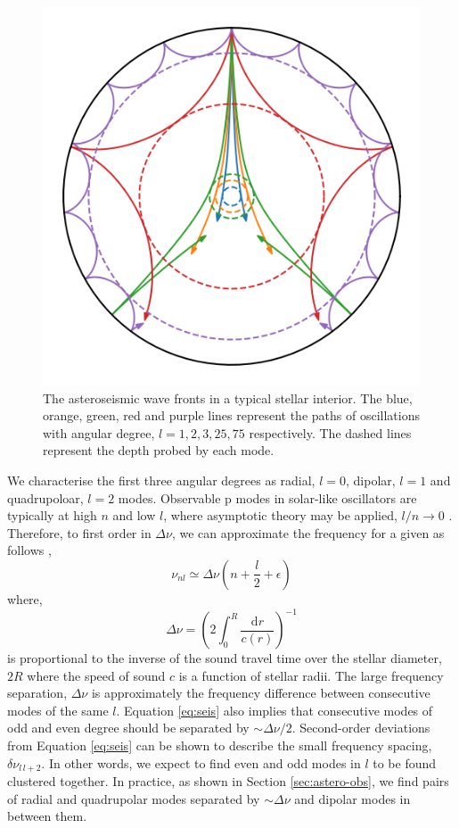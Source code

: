 \begin{figure}[ht]
    \centering
    \includegraphics[width=.5\linewidth]{introduction/images/seismo_wavefronts.png}
    \caption{The asteroseismic wave fronts in a typical stellar interior. The blue, orange, green, red and purple lines represent the paths of oscillations with angular degree, $l=1,2,3,25,75$ respectively. The dashed lines represent the depth probed by each mode.}
    \label{fig:waves}
\end{figure}

We characterise the first three angular degrees as radial, $l=0$, dipolar, $l=1$ and quadrupoloar, $l=2$ modes. Observable p modes in solar-like oscillators are typically at high $n$ and low $l$, where asymptotic theory may be applied, $l/n \rightarrow 0$ \citep{Tassoul1980}. Therefore, to first order in $\Delta\nu$, we can approximate the frequency for a given as follows \citep{Christensen-Dalsgaard1984},
%
\begin{equation}
    \nu_{nl} \simeq \Delta \nu\left(n+ \frac{l}{2} + \epsilon\right)\label{eq:seis}
\end{equation}
%
where,
%
\begin{equation}
    \Delta \nu = \left(2 \int_{0}^{R} \frac{\mathrm{d} r}{c(r)}\right)^{-1}
    \label{eq:dnu}
\end{equation}
%
is proportional to the inverse of the sound travel time over the stellar diameter, $2R$ where the speed of sound $c$ is a function of stellar radii. The large frequency separation, $\Delta\nu$ is approximately the frequency difference between consecutive modes of the same $l$. Equation \ref{eq:seis} also implies that consecutive modes of odd and even degree should be separated by $\sim \Delta \nu / 2$. Second-order deviations from Equation \ref{eq:seis} can be shown to describe the small frequency spacing, $\delta \nu_{l\,l+2}$. In other words, we expect to find even and odd modes in $l$ to be found clustered together. In practice, as shown in Section \ref{sec:astero-obs}, we find pairs of radial and quadrupolar modes separated by $\sim \Delta\nu$ and dipolar modes in between them.

